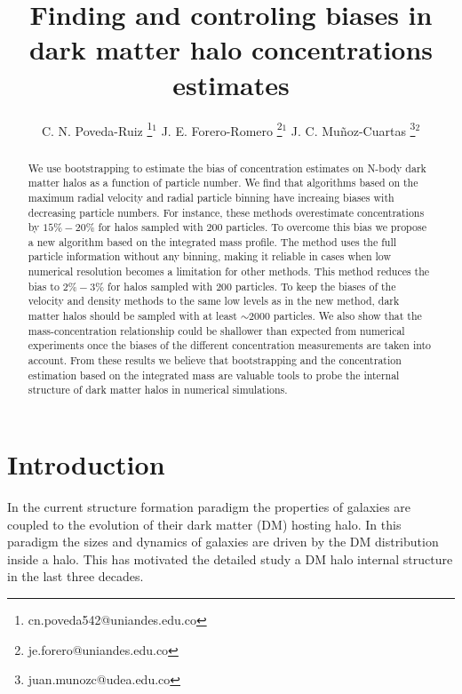 \documentclass{emulateapj}
\begin{document}
\title{Finding and controling biases in dark matter halo concentrations estimates}
\author{
  C. N. Poveda-Ruiz \thanks{cn.poveda542@uniandes.edu.co}$^{1}$
  J. E. Forero-Romero \thanks{je.forero@uniandes.edu.co}$^{1}$
  J. C. Mu\~noz-Cuartas \thanks{juan.munozc@udea.edu.co}$^{2}$
}




\begin{abstract}
We use bootstrapping to estimate the bias of concentration
estimates on N-body dark matter halos as a function of particle
number. 
We find that algorithms based on the maximum radial velocity
and radial particle binning have increaing biases with decreasing 
particle numbers.
For instance, these methods overestimate concentrations by 
$15\%-20\%$ for halos sampled with $200$ particles.  
To overcome this bias we propose a new algorithm based on the
integrated mass profile. 
The method uses the full particle information without any binning,
making it reliable in cases when low numerical resolution becomes a
limitation for other methods.
This method reduces the bias to $2\%-3\%$ for halos sampled with
$200$ particles.  
To keep the biases of the velocity and density methods to the same
low levels as in the new method, dark matter halos should be sampled
with at least $\sim 2000$ particles. 
We also show that the mass-concentration relationship could be
shallower than expected from numerical experiments once the biases 
of the different concentration measurements are taken into account.
From these results we believe that bootstrapping and the
concentration estimation based on the integrated mass are
valuable tools to probe the internal structure of dark matter halos
in numerical simulations.
\end{abstract}



\section{Introduction}
\label{sec:introduction}
In the current structure formation paradigm the properties of galaxies
are coupled to the evolution of their dark matter (DM) hosting halo.
In this paradigm the sizes and dynamics of galaxies are driven by
the DM distribution inside a halo. This has motivated the detailed study
a DM halo internal structure in the last three decades. 
\end{document}
